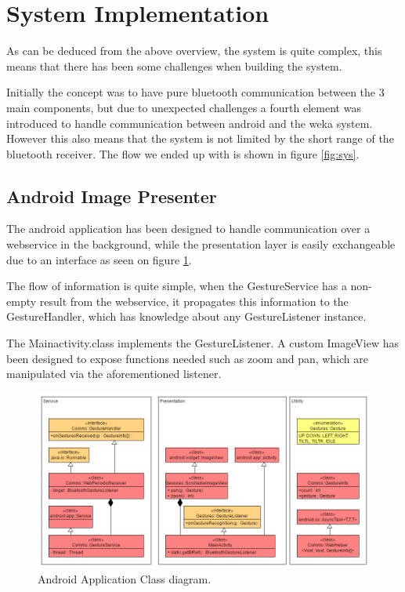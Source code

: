 \section{System Implementation} 
As can be deduced from the above overview, the system is quite complex,
this means that there has been some challenges when building the system.

Initially the concept was to have pure bluetooth communication between the 3 main components,
but due to unexpected challenges a fourth element was introduced to handle communication between android and the weka system. 
However this also means that the system is not limited by the short range of the bluetooth receiver.
The flow we ended up with is shown in figure \ref{fig:sys}.

\subsection{Android Image Presenter}
The android application has been designed to handle communication over a webservice in the background, 
while the presentation layer is easily exchangeable due to an interface as seen on figure \ref{fig:and_class}.


The flow of information is quite simple, when the GestureService has a non-empty result from the webservice,
it propagates this information to the GestureHandler, which has knowledge about any GestureListener instance.


The Mainactivity.class implements the GestureListener.
A custom ImageView has been designed to expose functions needed such as zoom and pan, which are manipulated via the aforementioned listener.

\begin{figure}[!h]
\centering
\includegraphics[width=0.9\columnwidth]{img/android_class_diagram}
\caption{Android Application Class diagram.}
\label{fig:and_class}
\end{figure}


